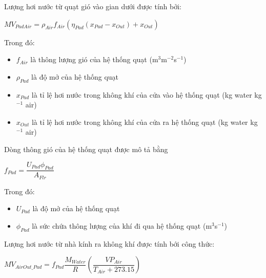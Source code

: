 \documentclass[a4paper]{article}
\begin{document}
    Lượng hơi nước từ quạt gió vào gian dưới được tính bởi:
    \begin{center}
        $MV_{PadAir} = \rho_{Air}f_{Air}(\eta_{Pad}(x_{Pad} - x_{Out}) + x_{Out})$
    \end{center}
    Trong đó:
    \begin{itemize}
        \item $f_{Air}$ là thông lượng gió của hệ thống quạt (m$^3$m$^{-2}$s$^{-1}$)
        \item $\rho_{Pad}$ là độ mở của hệ thống quạt
        \item $x_{Pad}$ là tỉ lệ hơi nước trong không khí của cửa vào hệ thống quạt (kg water kg$^{-1}$ air)
        \item $x_{Out}$ là tỉ lệ hơi nước trong không khí của cửa ra hệ thống quạt (kg water kg$^{-1}$ air)
    \end{itemize}
    Dòng thông gió của hệ thống quạt được mô tả bằng
    \begin{center}
        $f_{Pad} = \dfrac{U_{Pad}\phi_{Pad}}{A_{Flr}}$
    \end{center}
    Trong đó:
    \begin{itemize}
        \item $U_{Pad}$ là độ mở của hệ thống quạt
        \item $\phi_{Pad}$ là sức chứa thông lượng của  khí đi qua hệ thống quạt (m$^3$s$^{-1}$)   
    \end{itemize}
    
    \vspace{5mm}
    
    Lượng hơi nước từ nhà kính ra không khí được tính bới công thức:
    \begin{center}
        $MV_{AirOut\_Pad} = f_{Pad}\dfrac{M_{Water}}{R}\left(\dfrac{VP_{Air}}{T_{Air} + 273.15}\right)$
    \end{center}
    
    \vspace{5mm}
    
\end{document}
